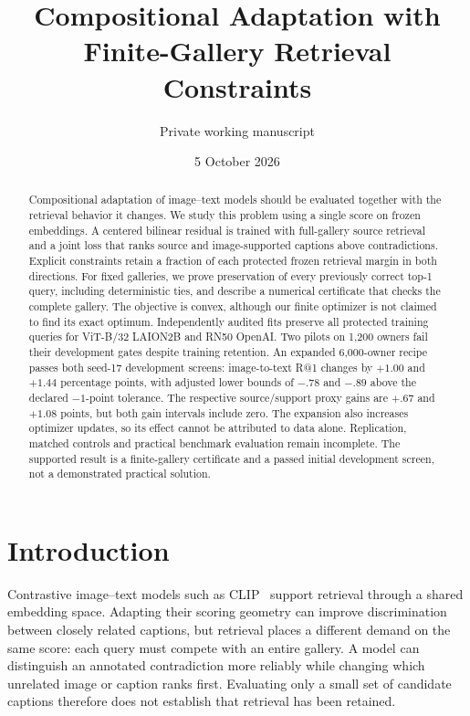 \documentclass[11pt]{article}
\title{Compositional Adaptation with Finite-Gallery Retrieval Constraints}
\author{Private working manuscript}
\date{5 October 2026}
\begin{document}
\pagestyle{draftstatus}
\maketitle
\begin{center}
\end{center}

\begin{abstract}
Compositional adaptation of image--text models should be evaluated together
with the retrieval behavior it changes. We study this problem using a
single score on frozen embeddings. A centered bilinear residual is trained
with full-gallery source retrieval and a joint loss that ranks source and
image-supported captions above contradictions. Explicit constraints retain
a fraction of each protected frozen retrieval margin in both directions.
For fixed galleries, we prove preservation of every previously correct
top-1 query, including deterministic ties, and describe a numerical
certificate that checks the complete gallery. The objective is convex,
although our finite optimizer is not claimed to find its exact optimum.
Independently audited fits preserve all protected training queries for
ViT-B/32 LAION2B and RN50 OpenAI. Two pilots on 1,200 owners fail their
development gates despite training retention. An expanded 6,000-owner
recipe passes both seed-17 development screens: image-to-text R@1 changes
by $+1.00$ and $+1.44$ percentage points, with adjusted lower bounds of
$-.78$ and $-.89$ above the declared $-1$-point tolerance. The respective
source/support proxy gains are $+.67$ and $+1.08$ points, but both gain
intervals include zero. The expansion also increases optimizer updates,
so its effect cannot be attributed to data alone. Replication, matched
controls and practical benchmark evaluation remain incomplete. The
supported result is a finite-gallery certificate and a passed initial
development screen, not a demonstrated practical solution.
\end{abstract}

\section{Introduction}
Contrastive image--text models such as CLIP~\cite{clip} support retrieval
through a shared embedding space. Adapting their scoring geometry can
improve discrimination between closely related captions, but retrieval
places a different demand on the same score: each query must compete with
an entire gallery. A model can distinguish an annotated contradiction more
reliably while changing which unrelated image or caption ranks first.
Evaluating only a small set of candidate captions therefore does not
establish that retrieval has been retained.
\end{document}
